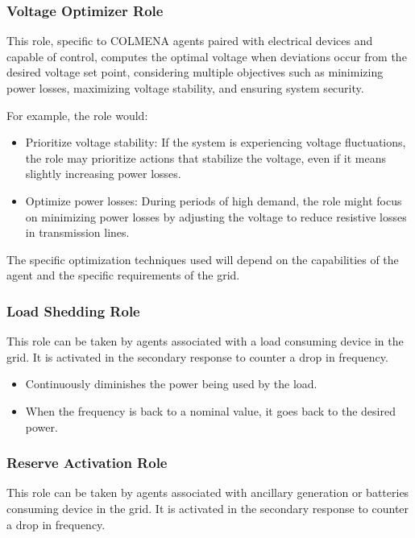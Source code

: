 \documentclass{article}
\begin{document}
\subsubsection*{Voltage Optimizer Role}

This role, specific to COLMENA agents paired with electrical devices and capable of control, computes the optimal voltage when deviations occur from the desired voltage set point, considering multiple objectives such as minimizing power losses, maximizing voltage stability, and ensuring system security.

For example, the role would:

\begin{itemize}
    \item Prioritize voltage stability: If the system is experiencing voltage fluctuations, the role may prioritize actions that stabilize the voltage, even if it means slightly increasing power losses.
    \item Optimize power losses: During periods of high demand, the role might focus on minimizing power losses by adjusting the voltage to reduce resistive losses in transmission lines.
\end{itemize}

The specific optimization techniques used will depend on the capabilities of the agent and the specific requirements of the grid.
\subsubsection*{Load Shedding Role}

This role can be taken by agents associated with a load consuming device in the grid. It is activated in the secondary response to counter a drop in frequency.

\begin{itemize}
    \item Continuously diminishes the power being used by the load.
    \item When the frequency is back to a nominal value, it goes back to the desired power.
\end{itemize}

\subsubsection*{Reserve Activation Role}

This role can be taken by agents associated with ancillary generation or batteries consuming device in the grid. It is activated in the secondary response to counter a drop in frequency.
\end{document}

